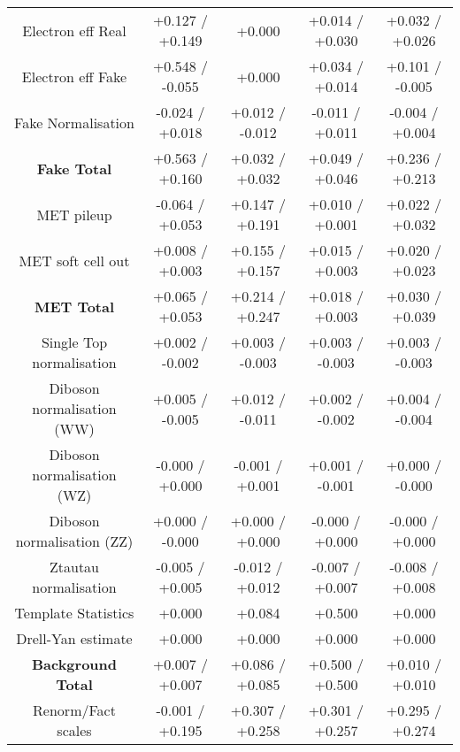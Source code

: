 \begin{table}[htbp]
\begin{center}
\begin{tabular}{|c|c|c|c|c|}
Electron eff Real                     &+0.127   / +0.149   & +0.000              & +0.014   / +0.030   & +0.032   / +0.026  \\
Electron eff Fake                     &+0.548   / -0.055   & +0.000              & +0.034   / +0.014   & +0.101   / -0.005  \\
Fake Normalisation                    &-0.024   / +0.018   & +0.012   / -0.012   & -0.011   / +0.011   & -0.004   / +0.004  \\
\hline
\textbf{Fake Total}                   &+0.563   / +0.160   & +0.032   / +0.032   & +0.049   / +0.046   & +0.236   / +0.213  \\
\hline
MET pileup                            &-0.064   / +0.053   & +0.147   / +0.191   & +0.010   / +0.001   & +0.022   / +0.032  \\
MET soft cell out                     &+0.008   / +0.003   & +0.155   / +0.157   & +0.015   / +0.003   & +0.020   / +0.023  \\
\hline
\textbf{MET Total}                    &+0.065   / +0.053   & +0.214   / +0.247   & +0.018   / +0.003   & +0.030   / +0.039  \\
\hline
Single Top normalisation              &+0.002   / -0.002   & +0.003   / -0.003   & +0.003   / -0.003   & +0.003   / -0.003  \\
Diboson normalisation (WW)            &+0.005   / -0.005   & +0.012   / -0.011   & +0.002   / -0.002   & +0.004   / -0.004  \\
Diboson normalisation (WZ)            &-0.000   / +0.000   & -0.001   / +0.001   & +0.001   / -0.001   & +0.000   / -0.000  \\
Diboson normalisation (ZZ)            &+0.000   / -0.000   & +0.000   / +0.000   & -0.000   / +0.000   & -0.000   / +0.000  \\
Ztautau normalisation                 &-0.005   / +0.005   & -0.012   / +0.012   & -0.007   / +0.007   & -0.008   / +0.008  \\
Template Statistics                   &+0.000              & +0.084              & +0.500              & +0.000             \\
Drell-Yan estimate                    &+0.000              & +0.000              & +0.000              & +0.000             \\
\hline
\textbf{Background Total}             &+0.007   / +0.007   & +0.086   / +0.085   & +0.500   / +0.500   & +0.010   / +0.010  \\
\hline
Renorm/Fact scales                    &-0.001   / +0.195   & +0.307   / +0.258   & +0.301   / +0.257   & +0.295   / +0.274  \\

\end{tabular}
\end{center}
\end{table}
